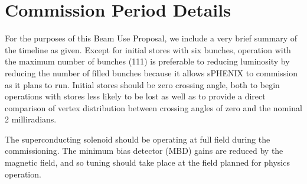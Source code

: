 \section{Commission Period Details}

For the purposes of this Beam Use Proposal, we include a very brief summary of the timeline as given.    
Except for initial stores with six bunches, operation with the maximum number of 
bunches (111) is preferable to reducing luminosity by reducing the number of
filled bunches because it allows sPHENIX to commission as it plans to run.  Initial 
stores should be zero crossing angle, both to begin operations with stores less likely to
be lost as well as to provide a direct comparison of vertex distribution between crossing angles of zero and the nominal 2 milliradians.

The superconducting solenoid should be operating at full field during the commissioning.
The minimum bias detector (MBD) gains are reduced by the magnetic field, and so tuning should take place at the field planned for physics operation.

